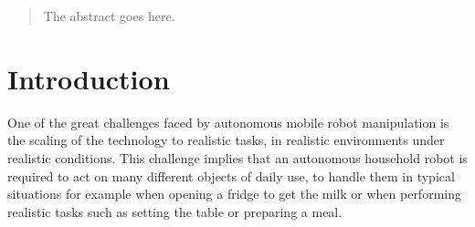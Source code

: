 \documentclass[conference]{sty/IEEEtran}
\begin{document}
\newcommand{\todo}[1]{\textbf{\textcolor{red}{TODO: #1}}}
\maketitle

\begin{abstract}
The abstract goes here.

\end{abstract}

\IEEEpeerreviewmaketitle

\section{Introduction}
One of the great challenges faced by autonomous mobile robot
manipulation is the scaling of the technology to realistic tasks, in
realistic environments under realistic conditions. This challenge
implies that an autonomous household robot is required to act on many
different objects of daily use, to handle them in typical situations
for example when opening a fridge to get the milk or when performing
realistic tasks such as setting the table or preparing a meal.
\end{document}
